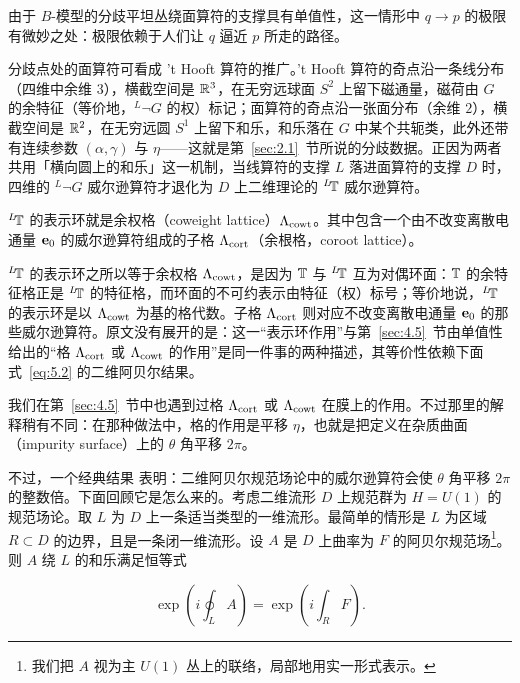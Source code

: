 由于 $B$-模型的分歧平坦丛绕面算符的支撑具有单值性，这一情形中 $q\to p$ 的极限有微妙之处：极限依赖于人们让 $q$ 逼近 $p$ 所走的路径。

\begin{yizhu}[物理图像补充]
分歧点处的面算符可看成 't Hooft 算符的推广。't Hooft 算符的奇点沿一条线分布（四维中余维 $3$），横截空间是 ${\mathbb{R}}^3$，在无穷远球面 $S^2$ 上留下磁通量，磁荷由 $G$ 的余特征（等价地，$^L\neg G$ 的权）标记；面算符的奇点沿一张面分布（余维 $2$），横截空间是 ${\mathbb{R}}^2$，在无穷远圆 $S^1$ 上留下和乐，和乐落在 $G$ 中某个共轭类，此外还带有连续参数 $(\alpha,\gamma)$ 与 $\eta$——这就是第~\ref{sec:2.1}~节所说的分歧数据。正因为两者共用「横向圆上的和乐」这一机制，当线算符的支撑 $L$ 落进面算符的支撑 $D$ 时，四维的 $^L\neg G$ 威尔逊算符才退化为 $D$ 上二维理论的 $^L\negthinspace {\mathbb{T}}$ 威尔逊算符。
\end{yizhu}

\bigskip{}

$^L\negthinspace {\mathbb{T}}$ 的表示环就是余权格（coweight lattice）$\Lambda_{\rm cowt}$。其中包含一个由不改变离散电通量 ${\bf e}_0$ 的威尔逊算符组成的子格 $\Lambda_{\rm cort}$（余根格，coroot lattice）。

\begin{yizhu}[含糊点拨]
$^L\negthinspace {\mathbb{T}}$ 的表示环之所以等于余权格 $\Lambda_{\rm cowt}$，是因为 ${\mathbb{T}}$ 与 $^L\negthinspace {\mathbb{T}}$ 互为对偶环面：${\mathbb{T}}$ 的余特征格正是 $^L\negthinspace {\mathbb{T}}$ 的特征格，而环面的不可约表示由特征（权）标号；等价地说，$^L\negthinspace {\mathbb{T}}$ 的表示环是以 $\Lambda_{\rm cowt}$ 为基的格代数。子格 $\Lambda_{\rm cort}$ 则对应不改变离散电通量 ${\bf e}_0$ 的那些威尔逊算符。原文没有展开的是：这一“表示环作用”与第~\ref{sec:4.5}~节由单值性给出的“格 $\Lambda_{\rm cort}$ 或 $\Lambda_{\rm cowt}$ 的作用”是同一件事的两种描述，其等价性依赖下面式~\eqref{eq:5.2} 的二维阿贝尔结果。
\end{yizhu}

我们在第~\ref{sec:4.5}~节中也遇到过格 $\Lambda_{\rm cort}$ 或 $\Lambda_{\rm cowt}$ 在膜上的作用。不过那里的解释稍有不同：在那种做法中，格的作用是平移 $\eta$，也就是把定义在杂质曲面（impurity surface）上的 $\theta$ 角平移 $2\pi$。

不过，一个经典结果 \cite{ref76} 表明：二维阿贝尔规范场论中的威尔逊算符会使 $\theta$ 角平移 $2\pi$ 的整数倍。下面回顾它是怎么来的。考虑二维流形 $D$ 上规范群为 $H=U(1)$ 的规范场论。取 $L$ 为 $D$ 上一条适当类型的一维流形。最简单的情形是 $L$ 为区域 $R\subset D$ 的边界，且是一条闭一维流形。设 $A$ 是 $D$ 上曲率为 $F$ 的阿贝尔规范场\footnote{我们把 $A$ 视为主 $U(1)$ 丛上的联络，局部地用实一形式表示。}。则 $A$ 绕 $L$ 的和乐满足恒等式

\setcounter{equation}{1}
\begin{equation}\label{eq:5.2}
  \exp\left(i\oint_LA\right)=\exp\left(i\int_RF\right).
\end{equation}

